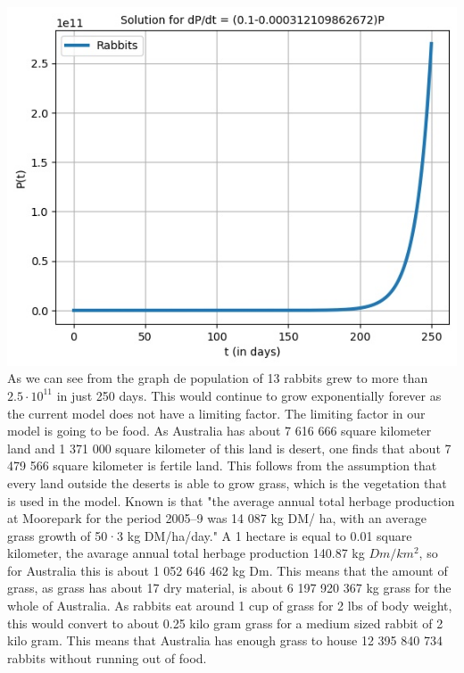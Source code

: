 \documentclass{article}
\begin{document}
\includegraphics[scale=0.78]{Pictures/unr_rabbitts}
\\ 
As we can see from the graph de population of 13 rabbits grew to more than  $2.5\cdot10^{11}$ in just 250 days. This would continue to grow exponentially forever as the current model does not have a limiting factor. The limiting factor in our model is going to be food. As Australia has about 7 616 666 square kilometer land and 1 371 000 square kilometer of this land is desert, one finds that about 7 479 566 square kilometer is fertile land. This follows from the assumption that every land outside the deserts is able to grow grass, which is the vegetation that is used in the model. Known is that "the average annual total herbage production at Moorepark for the period 2005–9 was 14 087 kg DM/ ha, with an average grass growth of 50·3 kg DM/ha/day." A 1 hectare is equal to 0.01 square kilometer, the avarage annual total herbage production 140.87 kg $Dm/km^2$, so for Australia this is about 1 052 646 462 kg Dm. This means that the amount of grass, as grass has about 17 dry material, is about 6 197 920 367 kg grass for the whole of Australia. As rabbits eat around 1 cup of grass for 2 lbs of body weight, this would convert to about 0.25 kilo gram grass for a medium sized rabbit of 2 kilo gram. This means that Australia has enough grass to house 12 395 840 734 rabbits without running out of food.
\end{document}
